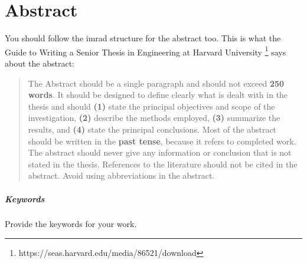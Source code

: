 \chapter*{Abstract}
\begin{instructions}

You should follow the \acrfull{imrad} structure for the abstract too. This is what the Guide to Writing a Senior Thesis in Engineering at Harvard University \footnote{https://seas.harvard.edu/media/86521/download} says about the abstract:
\begin{quotation}
    The Abstract should be a single paragraph and should not exceed \textbf{250 words}. It should be designed to define clearly what is dealt with in the thesis and should \textbf{(1)} state the principal objectives and scope of the investigation, \textbf{(2)} describe the methods employed, \textbf{(3)} summarize the results, and \textbf{(4)} state the principal conclusions. Most of the abstract should be written in the \textbf{past tense}, because it refers to completed work. The abstract should never give any information or conclusion that is not stated in the thesis. References to the literature should not be cited in the abstract. Avoid using abbreviations in the abstract.
\end{quotation}
\end{instructions}


\paragraph{Keywords}
\begin{instructions}
Provide the keywords for your work.
\end{instructions}
